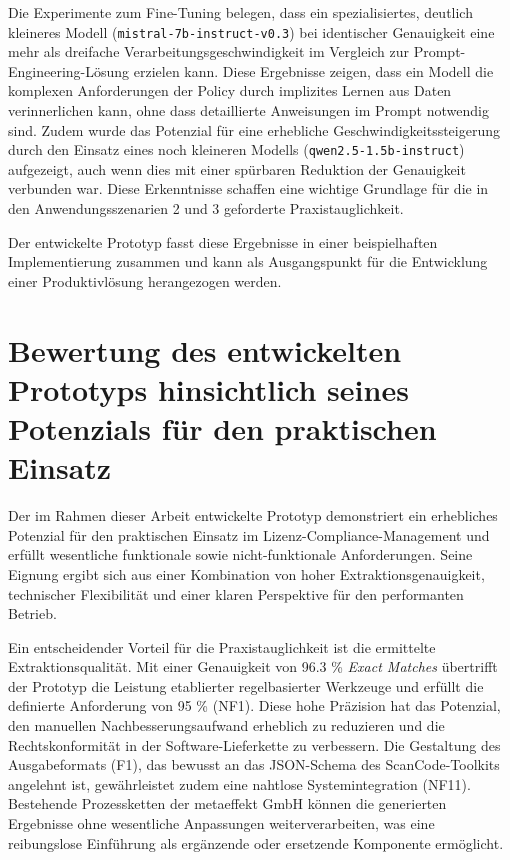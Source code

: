 Die Experimente zum Fine-Tuning belegen, dass ein spezialisiertes, deutlich kleineres Modell (\texttt{mistral-7b-instruct-v0.3}) bei identischer Genauigkeit eine mehr als dreifache Verarbeitungsgeschwindigkeit im Vergleich zur Prompt-Engineering-Lösung erzielen kann.
Diese Ergebnisse zeigen, dass ein Modell die komplexen Anforderungen der Policy durch implizites Lernen aus Daten verinnerlichen kann, ohne dass detaillierte Anweisungen im Prompt notwendig sind.
Zudem wurde das Potenzial für eine erhebliche Geschwindigkeitssteigerung durch den Einsatz eines noch kleineren Modells (\texttt{qwen2.5-1.5b-instruct}) aufgezeigt, auch wenn dies mit einer spürbaren Reduktion der Genauigkeit verbunden war.
Diese Erkenntnisse schaffen eine wichtige Grundlage für die in den Anwendungsszenarien 2 und 3 geforderte Praxistauglichkeit.

Der entwickelte Prototyp fasst diese Ergebnisse in einer beispielhaften Implementierung zusammen und kann als Ausgangspunkt für die Entwicklung einer Produktivlösung herangezogen werden.


\section{Bewertung des entwickelten Prototyps hinsichtlich seines Potenzials für den
praktischen Einsatz}

Der im Rahmen dieser Arbeit entwickelte Prototyp demonstriert ein erhebliches Potenzial für den praktischen Einsatz im Lizenz-Compliance-Management und erfüllt wesentliche funktionale sowie nicht-funktionale Anforderungen.
Seine Eignung ergibt sich aus einer Kombination von hoher Extraktionsgenauigkeit, technischer Flexibilität und einer klaren Perspektive für den performanten Betrieb.

Ein entscheidender Vorteil für die Praxistauglichkeit ist die ermittelte Extraktionsqualität.
Mit einer Genauigkeit von \num{96,3} \% \textit{Exact Matches} übertrifft der Prototyp die Leistung etablierter regelbasierter Werkzeuge und erfüllt die definierte Anforderung von \num{95} \% (NF1).
Diese hohe Präzision hat das Potenzial, den manuellen Nachbesserungsaufwand erheblich zu reduzieren und die Rechtskonformität in der Software-Lieferkette zu verbessern.
Die Gestaltung des Ausgabeformats (F1), das bewusst an das JSON-Schema des ScanCode-Toolkits angelehnt ist, gewährleistet zudem eine nahtlose Systemintegration (NF11).
Bestehende Prozessketten der metaeffekt GmbH können die generierten Ergebnisse ohne wesentliche Anpassungen weiterverarbeiten, was eine reibungslose Einführung als ergänzende oder ersetzende Komponente ermöglicht.

